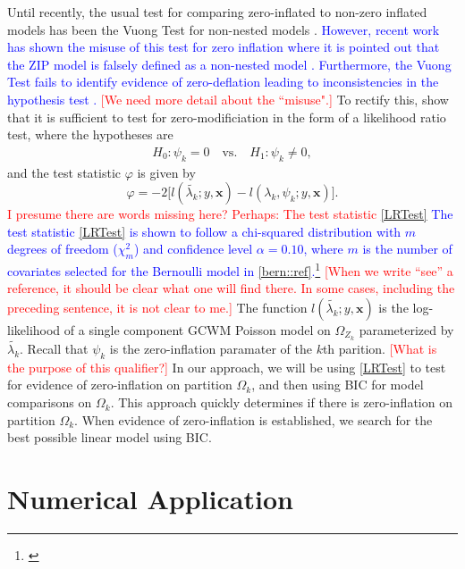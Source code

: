 \documentclass[11pt,letterpaper]{article}
\numberwithin{equation}{section}
\numberwithin{equation}{section}
\numberwithin{equation}{section}
\begin{document}
Until recently, the usual test for comparing zero-inflated to non-zero inflated models has been the Vuong Test for non-nested models \citep{vuongTest}. \textcolor{blue}{However, recent work has shown the misuse of this test for zero inflation where it is pointed out that the ZIP model is falsely defined as a non-nested model . Furthermore, the Vuong Test fails to identify evidence of zero-deflation leading to inconsistencies in the hypothesis test \citep[see][]{misuse}.}  \textcolor{red}{[We need more detail about the ``misuse".]} To rectify this, \cite{newIntuitive} show that it is sufficient to test for zero-modificiation in the form of a likelihood ratio test, where the hypotheses are
\begin{align*}
& & H_0: \psi_k = 0 \quad \text{vs.} \quad H_1: \psi_k \neq 0, & &
\end{align*}
and the test statistic $\varphi$ is given by
\begin{equation}
\varphi = -2 \big[l(\tilde{\lambda_k}; y, \bm{x}) - l(\lambda_k, \psi_k; y , \bm{x} )\big].
\label{LRTest}
\end{equation}
\textcolor{red}{I presume there are words missing here? Perhaps: The test statistic \eqref{LRTest}} \textcolor{blue}{The test statistic \eqref{LRTest} is shown to follow a chi-squared distribution with $m$ degrees of freedom ($\chi^2_m $) and confidence level $\alpha = 0.10$, where $m$ is the number of covariates selected for the Bernoulli model in \eqref{bern::ref}.\footnote{\citep[see Liklihood Ratio Tests in ][]{newIntuitive}} } \textcolor{red}{[When we write ``see'' a reference, it should be clear what one will find there. In some cases, including the preceding sentence, it is not clear to me.]} The function 
$l(\tilde{\lambda_k}; y , \bm{x})$ is the log-likelihood of a single component GCWM Poisson model on $\Omega_{Z_k}$ parameterized by $\tilde{\lambda_k}$. Recall that $\psi_k$ is the zero-inflation paramater of the $k$th parition.  \textcolor{red}{[What is the purpose of this qualifier?]} In our approach, we will be using \eqref{LRTest} to  test for evidence of zero-inflation on partition $\Omega_k$, and then using BIC for model comparisons on $\Omega_k$. This approach quickly determines if there is zero-inflation on partition $\Omega_k$.  When evidence of zero-inflation is established, we search for the best possible linear model using BIC. 

\section{Numerical Application}\label{sec:numapp}
\end{document}
